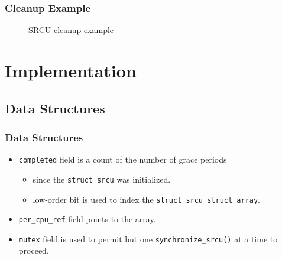 \documentclass{beamer}
\begin{document}

\begin{frame}[t]
  \frametitle{Cleanup Example}
  
  \begin{figure}
    \begin{columns}
      \begin{column}{.5\textwidth}
        
      \end{column}

      \begin{column}{.5\textwidth}
        
      \end{column}
    \end{columns}
    \caption{SRCU cleanup example}
  \end{figure}
  
\end{frame}


\section{Implementation}


\subsection{Data Structures}


\begin{frame}[t]
  \frametitle{Data Structures}

  \begin{figure}
    
  \end{figure}

  \begin{itemize}
  \item \texttt{completed} field is a count of the number of grace periods
    \begin{itemize}
    \item since the \texttt{struct srcu} was initialized.
    \item low-order bit is used to index the \texttt{struct srcu\_struct\_array}.
    \end{itemize}
  \item \texttt{per\_cpu\_ref} field points to the array.
  \item \texttt{mutex} field is used to permit but one \texttt{synchronize\_srcu()} at
    a time to proceed.
  \end{itemize}
  
\end{frame}
\end{document}
